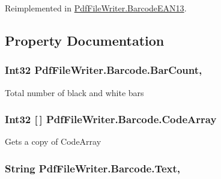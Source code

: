 Reimplemented in \hyperlink{class_pdf_file_writer_1_1_barcode_e_a_n13_a765121df0b785c75a9c570bad7a2074e}{Pdf\+File\+Writer.\+Barcode\+E\+A\+N13}.



\subsection{Property Documentation}
\subsubsection[{\texorpdfstring{Bar\+Count}{BarCount}}]{\setlength{\rightskip}{0pt plus 5cm}Int32 Pdf\+File\+Writer.\+Barcode.\+Bar\+Count\hspace{0.3cm}{\ttfamily [get]}, {}}\hypertarget{class_pdf_file_writer_1_1_barcode_a748eca8ece577f3e6608289d9a07987c}{}\label{class_pdf_file_writer_1_1_barcode_a748eca8ece577f3e6608289d9a07987c}


Total number of black and white bars 

\subsubsection[{\texorpdfstring{Code\+Array}{CodeArray}}]{\setlength{\rightskip}{0pt plus 5cm}Int32 \mbox{[}$\,$\mbox{]} Pdf\+File\+Writer.\+Barcode.\+Code\+Array\hspace{0.3cm}{\ttfamily [get]}}\hypertarget{class_pdf_file_writer_1_1_barcode_a4e907e1c98d1b9fe5ca19b6221169a60}{}\label{class_pdf_file_writer_1_1_barcode_a4e907e1c98d1b9fe5ca19b6221169a60}


Gets a copy of Code\+Array 

\subsubsection[{\texorpdfstring{Text}{Text}}]{\setlength{\rightskip}{0pt plus 5cm}String Pdf\+File\+Writer.\+Barcode.\+Text\hspace{0.3cm}{\ttfamily [get]}, {}}\hypertarget{class_pdf_file_writer_1_1_barcode_a1fe2157662e4a1b52264823a382fde3f}{}\label{class_pdf_file_writer_1_1_barcode_a1fe2157662e4a1b52264823a382fde3f}



